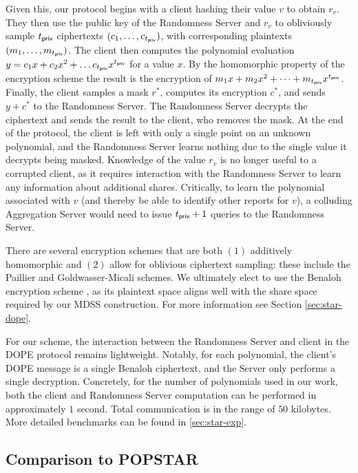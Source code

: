 Given this, our protocol begins with a client hashing their value $v$ to obtain $r_v$. They then use the public key of the Randomness Server and $r_v$ to obliviously sample $t_{\sf priv}$ ciphertexts $(c_1, \dots, c_{t_{\sf priv}})$, with corresponding plaintexts $(m_1,\dots,m_{t_{\sf priv}})$.
The client then computes the polynomial evaluation $y = c_1x + c_2x^2 + \dots c_{t_{\sf priv}}x^{t_{\sf priv}}$ for a value $x$.
By the homomorphic property of the encryption scheme the result is the encryption of $m_1x + m_2x^2 + \dots + m_{t_{\sf priv}}x^{t_{\sf priv}}$.
Finally, the client samples a mask $r^*$, computes its encryption $c^*$, and sends $y + c^*$ to the Randomness Server.
The Randomness Server decrypts the ciphertext and sends the result to the client, who removes the mask.
At the end of the protocol, the client is left with only a single point on an unknown polynomial, and the Randomness Server learns nothing due to the single value it decrypts being masked.
Knowledge of the value $r_v$ is no longer useful to a corrupted client, as it requires interaction with the Randomness Server to learn any information about additional shares.
Critically, to learn the polynomial associated with $v$ (and thereby be able to identify other reports for $v$), a colluding Aggregation Server would need to issue $t_{\sf priv} + 1$ queries to the Randomness Server.

There are several encryption schemes that are both $(1)$ additively homomorphic and $(2)$ allow for oblivious ciphertext sampling: these include the Paillier \cite{EC:Paillier99} and Goldwasser-Micali \cite{STOC:GolMic82} schemes. We ultimately elect to use the Benaloh encryption scheme \cite{THESIS:Ben87,SAC:Ben94}, as its plaintext space aligns well with the share space required by our MDSS construction. For more information see Section \cref{sec:star-dope}.

For our scheme, the interaction between the Randomness Server and client in the DOPE protocol remains lightweight. Notably, for each polynomial, the client's DOPE message is a single Benaloh ciphertext, and the Server only performs a single decryption. Concretely, for the number of polynomials used in our work, both the client and Randomness Server computation can be performed in approximately $1$ second. Total communication is in the range of $50$ kilobytes.
More detailed benchmarks can be found in \cref{sec:star-exp}.


\subsection{Comparison to POPSTAR}
\label{subsec:popstar-leakage}
\label{subsec-comparison-to-prior-work}

